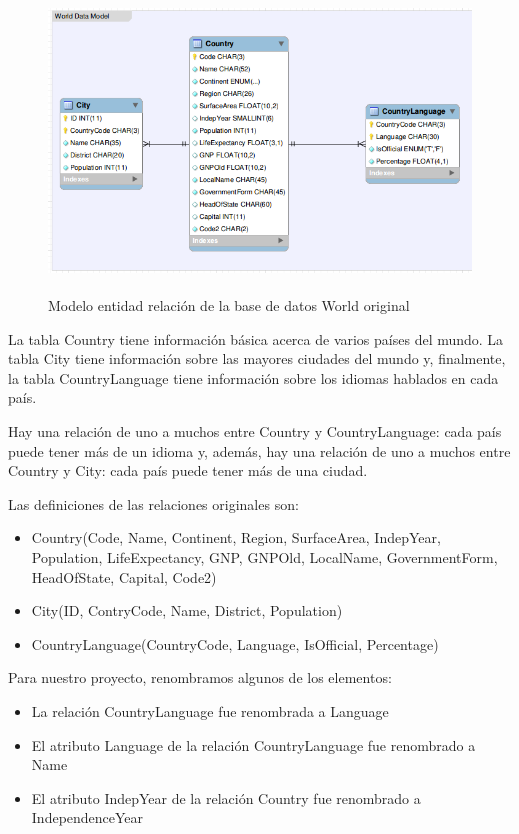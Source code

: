 \begin{figure}
  \centering
    \includegraphics[width=12.823cm,height=8.004cm]{graficos/fuentes/world-db.png}
  \caption{Modelo entidad relación de la base de datos World original}
  \label{fig:world-db}
\end{figure}

La tabla Country tiene información básica acerca de varios países del mundo. La tabla City tiene información sobre las mayores ciudades del mundo y, finalmente, la tabla CountryLanguage tiene información sobre los idiomas hablados en cada país.

Hay una relación de uno a muchos entre Country y CountryLanguage: cada país puede tener más de un idioma y, además, hay una relación de uno a muchos entre Country y City: cada país puede tener más de una ciudad.

\medskip
Las definiciones de las relaciones originales son:
\begin{itemize}
\item Country(Code, Name, Continent, Region, SurfaceArea, IndepYear, Population, LifeExpectancy, GNP, GNPOld, LocalName, GovernmentForm, HeadOfState, Capital, Code2)
\item City(ID, ContryCode, Name, District, Population)
\item CountryLanguage(CountryCode, Language, IsOfficial, Percentage)
\end{itemize}


Para nuestro proyecto, renombramos algunos de los elementos:
\begin{itemize}
\item La relación CountryLanguage fue renombrada a Language
\item El atributo Language de la relación CountryLanguage fue renombrado a Name
\item El atributo IndepYear de la relación Country fue renombrado a IndependenceYear
\end{itemize}

